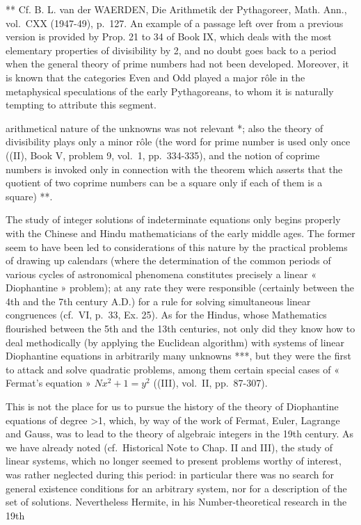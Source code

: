 ** Cf. B. L. van der WAERDEN, Die Arithmetik der Pythagoreer, Math. Ann., vol.~CXX (1947-49), p.~127. An example of a passage left over from a previous version is provided by Prop. 21 to 34 of Book IX, which deals with the most elementary properties of divisibility by 2, and no doubt goes back to a period when the general theory of prime numbers had not been developed. Moreover, it is known that the categories Even and Odd played a major rôle in the metaphysical speculations of the early Pythagoreans, to whom it is naturally tempting to attribute this segment.

arithmetical nature of the unknowns was not relevant *; also the theory of divisibility plays only a minor rôle (the word for prime number is used only once ((II), Book V, problem 9, vol.~1, pp.~334-335), and the notion of coprime numbers is invoked only in connection with the theorem which asserts that the quotient of two coprime numbers can be a square only if each of them is a square) **.

The study of integer solutions of indeterminate equations only begins properly with the Chinese and Hindu mathematicians of the early middle ages. The former seem to have been led to considerations of this nature by the practical problems of drawing up calendars (where the determination of the common periods of various cycles of astronomical phenomena constitutes precisely a linear « Diophantine » problem); at any rate they were responsible (certainly between the 4th and the 7th century A.D.) for a rule for solving simultaneous linear congruences (cf.~VI, p.~33, Ex. 25). As for the Hindus, whose Mathematics flourished between the 5th and the 13th centuries, not only did they know how to deal methodically (by applying the Euclidean algorithm) with systems of linear Diophantine equations in arbitrarily many unknowns ***, but they were the first to attack and solve quadratic problems, among them certain special cases of « Fermat's equation » \(Nx^{2} + 1 = y^{2}\) ((III), vol.~II, pp.~87-307).

This is not the place for us to pursue the history of the theory of Diophantine equations of degree \textgreater1, which, by way of the work of Fermat, Euler, Lagrange and Gauss, was to lead to the theory of algebraic integers in the 19th century. As we have already noted (cf.~Historical Note to Chap. II and III), the study of linear systems, which no longer seemed to present problems worthy of interest, was rather neglected during this period: in particular there was no search for general existence conditions for an arbitrary system, nor for a description of the set of solutions. Nevertheless Hermite, in his Number-theoretical research in the 19th

